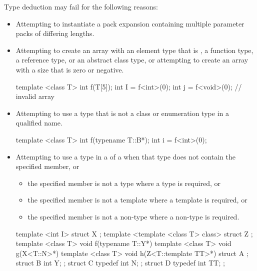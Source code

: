 \begin{note} Type deduction may fail for
the following reasons:

\begin{itemize}
\item Attempting to instantiate a pack expansion containing multiple parameter packs of differing lengths.
\item
Attempting to create an array with an element type that is , a
function type, a reference type, or an abstract class type, or attempting
to create an array with a size that is zero or negative.
\begin{example}

\begin{codeblock}
template <class T> int f(T[5]);
int I = f<int>(0);
int j = f<void>(0);             // invalid array
\end{codeblock}
\end{example}
\item
Attempting to use a type that is not a class or enumeration type in a qualified name.
\begin{example}

\begin{codeblock}
template <class T> int f(typename T::B*);
int i = f<int>(0);
\end{codeblock}
\end{example}
\item
Attempting to use a type in a  of a
 when
that type does not contain the specified member, or
\begin{itemize}
\item
the specified member is not a type where a type is required, or
\item
the specified member is not a template where a template is required, or
\item
the specified member is not a non-type where a non-type is required.
\end{itemize}
\begin{example}

\begin{codeblock}
template <int I> struct X { };
template <template <class T> class> struct Z { };
template <class T> void f(typename T::Y*){}
template <class T> void g(X<T::N>*){}
template <class T> void h(Z<T::template TT>*){}
struct A {};
struct B { int Y; };
struct C {
  typedef int N;
};
struct D {
  typedef int TT;
};


\end{codeblock}
\end{example}
\end{itemize}
\end{note}
